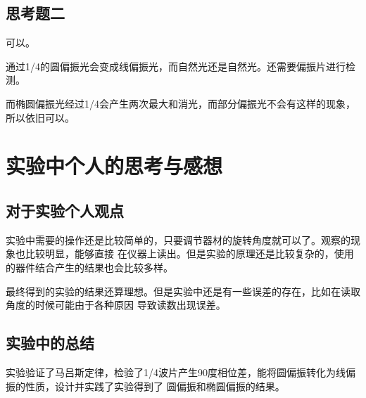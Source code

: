 \documentclass{ctexart}
\begin{document}
  \subsection{思考题二}
  可以。

  通过1/4的圆偏振光会变成线偏振光，而自然光还是自然光。还需要偏振片进行检测。

  而椭圆偏振光经过1/4会产生两次最大和消光，而部分偏振光不会有这样的现象，所以依旧可以。

\section{实验中个人的思考与感想}
  \subsection{对于实验个人观点}
  实验中需要的操作还是比较简单的，只要调节器材的旋转角度就可以了。观察的现象也比较明显，能够直接
  在仪器上读出。但是实验的原理还是比较复杂的，使用的器件结合产生的结果也会比较多样。

  最终得到的实验的结果还算理想。但是实验中还是有一些误差的存在，比如在读取角度的时候可能由于各种原因
  导致读数出现误差。

  \subsection{实验中的总结}
  实验验证了马吕斯定律，检验了1/4波片产生90度相位差，能将圆偏振转化为线偏振的性质，设计并实践了实验得到了
  圆偏振和椭圆偏振的结果。
\end{document}
